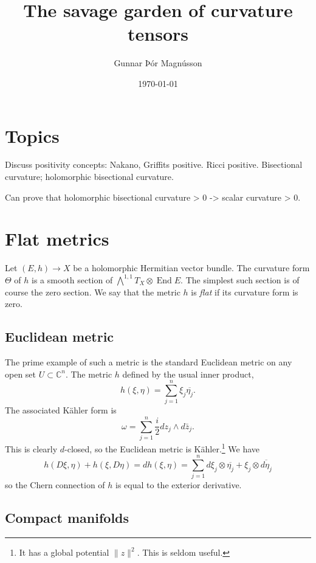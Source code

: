 \documentclass[11pt]{article}
\author{Gunnar Þór Magnússon}
\date{\today}
\title{The savage garden of curvature tensors}
\newcommand{\kk}[1]{\mathbb{#1}}
\DeclareMathOperator{\End}{End}
\begin{document}
\maketitle
\tableofcontents


\section{Topics}
\label{sec:org093d592}

Discuss positivity concepts: Nakano, Griffits positive. Ricci positive. Bisectional curvature; holomorphic bisectional curvature.

Can prove that holomorphic bisectional curvature > 0 -> scalar curvature > 0.


\section{Flat metrics}
\label{sec:org504b250}

Let $(E,h) \to X$ be a holomorphic Hermitian vector bundle. The curvature form $\Theta$ of $h$ is a smooth section of $\bigwedge^{1,1}T_X \otimes \End E$. The simplest such section is of course the zero section. We say that the metric $h$ is \emph{flat} if its curvature form is zero.


\subsection{Euclidean metric}

The prime example of such a metric is the standard Euclidean metric on any open set $U \subset \kk C^n$. The metric $h$ defined by the usual inner product,
$$
h(\xi, \eta) = \sum_{j=1}^n \xi_j \overline{\eta_j}.
$$
The associated K\"ahler form is
$$
\omega = \sum_{j=1}^n \frac{i}{2} dz_j \wedge d\bar z_j.
$$
This is clearly $d$-closed, so the Euclidean metric is K\"ahler.\footnote{It has a global potential $\|z\|^2$. This is seldom useful.} We have
$$
h(D\xi, \eta) + h(\xi, D\eta)
= d h(\xi, \eta)
= \sum_{j=1}^n d\xi_j \otimes \overline{\eta_j} + \xi_j \otimes \overline{d\eta_j}
$$
so the Chern connection of $h$ is equal to the exterior derivative.


\subsection{Compact manifolds}
\end{document}
